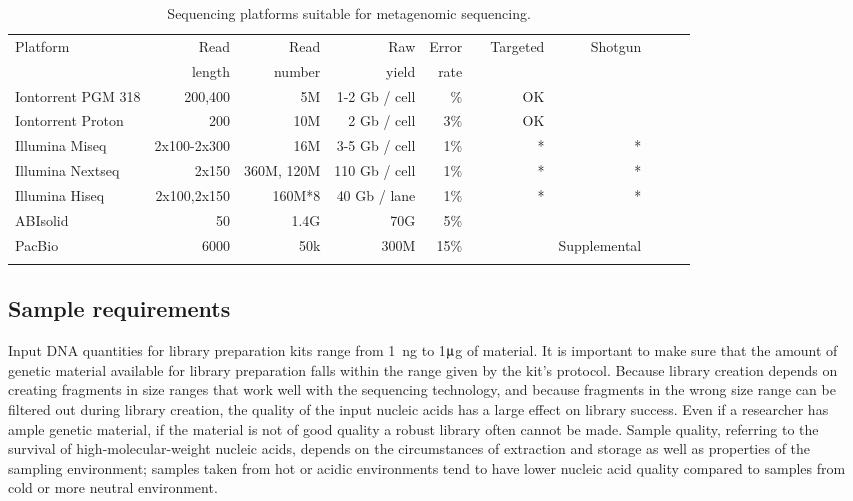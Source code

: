\documentclass[graybox]{svmult}
\begin{document}
\begin{table}
\caption{Sequencing platforms suitable for metagenomic sequencing.}
\begin{tabular}{lrrrrrrrrrr}
Platform &  Read & Read & Raw   & Error &       &  Targeted & Shotgun  \\
      & length & number & yield &  rate &       &           &         \\
Iontorrent PGM 318 &  200,400 & 5M & 1-2 Gb / cell & \% &  & OK &   \\
Iontorrent Proton &  200 & 10M & 2 Gb / cell & 3\% &  & OK &   \\
Illumina Miseq &  2x100-2x300 & 16M & 3-5 Gb / cell & 1\% &  & * & * \\
Illumina Nextseq &  2x150 & 360M, 120M & 110 Gb / cell & 1\% &  & * & * \\
Illumina Hiseq & 2x100,2x150 & 160M*8 & 40 Gb / lane & 1\% &  & * & * \\
ABIsolid & 50 & 1.4G & 70G & 5\% &  &  &   \\
PacBio &  6000 & 50k &300M  & 15\% &  &  & Supplemental  \\
  \\
\end{tabular}
\end{table}




\subsection{Sample requirements }
\label{subsec:4}
%
Input DNA quantities for library preparation kits range from 1~ng to  1$\umu$g of material. It is important to make sure that the amount of genetic material available for library preparation falls within the range given by the kit's protocol.
%
Because library creation depends on creating fragments in size ranges that work well with the sequencing technology, and because fragments in the wrong size range can be filtered out during library creation,  the quality of the input nucleic acids has a large effect on library success. 
Even if a researcher has ample genetic material, if the material is not of good quality a robust library often cannot be made. 
Sample quality, referring to the survival of high-molecular-weight nucleic acids, depends on the circumstances of extraction and storage as well as properties of the sampling environment; samples taken from hot or acidic environments tend to have lower nucleic acid quality compared to samples from cold or more neutral environment.
\end{document}
